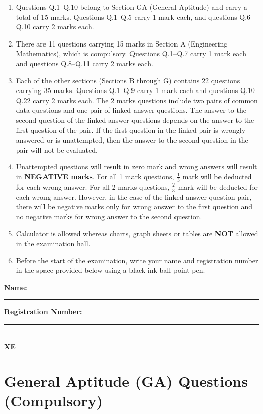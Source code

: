 \documentclass[12pt]{article}
\begin{document}
\begin{enumerate}[leftmargin=*]
    \item Questions Q.1--Q.10 belong to Section GA (General Aptitude) and carry a total of 15 marks. Questions Q.1--Q.5 carry 1 mark each, and questions Q.6--Q.10 carry 2 marks each.
    \item There are 11 questions carrying 15 marks in Section A (Engineering Mathematics), which is compulsory. Questions Q.1--Q.7 carry 1 mark each and questions Q.8--Q.11 carry 2 marks each.
    \item Each of the other sections (Sections B through G) contains 22 questions carrying 35 marks. Questions Q.1--Q.9 carry 1 mark each and questions Q.10--Q.22 carry 2 marks each. The 2 marks questions include two pairs of common data questions and one pair of linked answer questions. The answer to the second question of the linked answer questions depends on the answer to the first question of the pair. If the first question in the linked pair is wrongly answered or is unattempted, then the answer to the second question in the pair will not be evaluated.
    \item Unattempted questions will result in zero mark and wrong answers will result in \textbf{NEGATIVE marks}. For all 1 mark questions, $\tfrac{1}{3}$ mark will be deducted for each wrong answer. For all 2 marks questions, $\tfrac{2}{3}$ mark will be deducted for each wrong answer. However, in the case of the linked answer question pair, there will be negative marks only for wrong answer to the first question and no negative marks for wrong answer to the second question.
    \item Calculator is allowed whereas charts, graph sheets or tables are \textbf{NOT} allowed in the examination hall.
    \item Before the start of the examination, write your name and registration number in the space provided below using a black ink ball point pen.
\end{enumerate}

\noindent\textbf{Name:} \rule{8cm}{0.4pt} \newline \textbf{Registration Number:} \rule{5cm}{0.4pt} \\
\noindent\textbf{XE} 

\newpage

\section*{General Aptitude (GA) Questions (Compulsory)}
\end{document}
